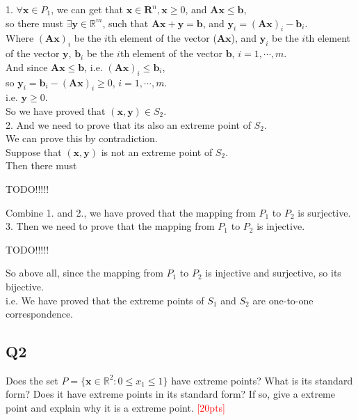 \documentclass[10pt]{article}
\renewcommand{\mathbf}{\boldsymbol}
\begin{document}
1. $\forall\mathbf{x}\in P_1$, we can get that $\mathbf{x}\in\mathbf{R}^n,\mathbf{x}\geq 0$, and $\mathbf{Ax}\leq\mathbf{b}$,\\
so there must $\exists \mathbf{y}\in \mathbb{R}^m$, such that $\mathbf{Ax}+\mathbf{y}=\mathbf{b}$, and $\mathbf{y}_i=(\mathbf{Ax})_i-\mathbf{b}_i$.\\
Where $(\mathbf{Ax})_i$ be the $i$th element of the vector ($\mathbf{Ax}$), and $\mathbf{y}_i$ be the $i$th element of the vector $\mathbf{y}$, $\mathbf{b}_i$ be the $i$th element of the vector $\mathbf{b}$, $i=1,\cdots,m$.\\
And since $\mathbf{Ax}\leq \mathbf{b}$, i.e. $(\mathbf{Ax})_i\leq\mathbf{b}_i$,\\
so $\mathbf{y}_i=\mathbf{b}_i-(\mathbf{Ax})_i\geq 0$, $i=1,\cdots,m$.\\
i.e. $\mathbf{y}\geq 0$.\\
So we have proved that $(\mathbf{x},\mathbf{y})\in S_2$.\\

2. And we need to prove that its also an extreme point of $S_2$.\\
We can prove this by contradiction.\\
Suppose that $(\mathbf{x},\mathbf{y})$ is not an extreme point of $S_2$.\\
Then there must 

TODO!!!!!



Combine 1. and 2., we have proved that the mapping from $P_1$ to $P_2$ is surjective.\\

3. Then we need to prove that the mapping from $P_1$ to $P_2$ is injective.

TODO!!!!!

So above all, since the mapping from $P_1$ to $P_2$ is injective and surjective, so its bijective.\\
i.e. We have proved that the extreme points of $S_1$ and $S_2$ are one-to-one correspondence.\\

\newpage
\subsection{Q2}
Does the set $P = \{ \bm{x} \in \mathbb{R}^{2} : 0 \leq x_{1} \leq 1 \}$ have extreme points? What is its standard form? Does it have extreme points in its standard form? If so, give a extreme point and explain why it is a extreme point.
\textcolor{red}{[20pts]}
\end{document}
